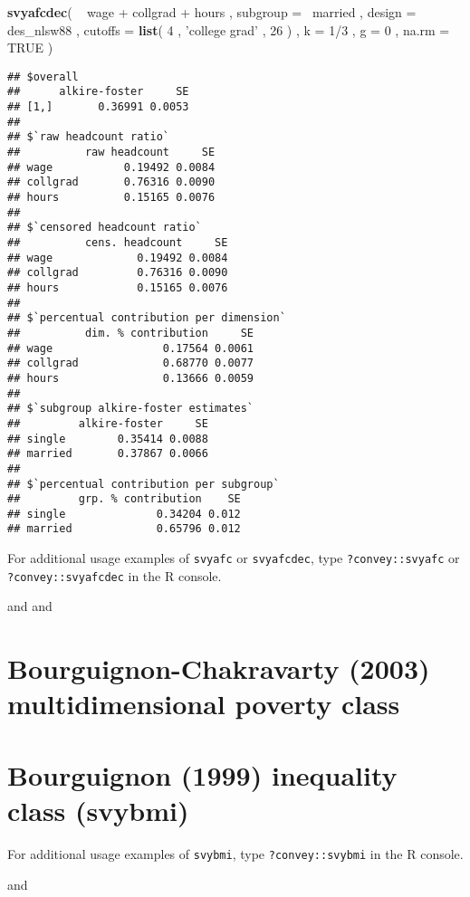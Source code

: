 \documentclass[]{book}
\newenvironment{Shaded}{\begin{snugshade}}{\end{snugshade}}
\newcommand{\KeywordTok}[1]{\textcolor[rgb]{0.13,0.29,0.53}{\textbf{{#1}}}}
\newcommand{\DataTypeTok}[1]{\textcolor[rgb]{0.13,0.29,0.53}{{#1}}}
\newcommand{\DecValTok}[1]{\textcolor[rgb]{0.00,0.00,0.81}{{#1}}}
\newcommand{\StringTok}[1]{\textcolor[rgb]{0.31,0.60,0.02}{{#1}}}
\newcommand{\OtherTok}[1]{\textcolor[rgb]{0.56,0.35,0.01}{{#1}}}
\newcommand{\NormalTok}[1]{{#1}}
\begin{document}
\begin{Shaded}
\begin{Highlighting}[]
\KeywordTok{svyafcdec}\NormalTok{(}
    \NormalTok{~}\StringTok{ }\NormalTok{wage +}\StringTok{ }\NormalTok{collgrad +}\StringTok{ }\NormalTok{hours , }
    \DataTypeTok{subgroup =} \NormalTok{~married , }
    \DataTypeTok{design =} \NormalTok{des_nlsw88 , }
    \DataTypeTok{cutoffs =} \KeywordTok{list}\NormalTok{( }\DecValTok{4} \NormalTok{, }\StringTok{'college grad'} \NormalTok{, }\DecValTok{26} \NormalTok{) , }
    \DataTypeTok{k =} \DecValTok{1}\NormalTok{/}\DecValTok{3} \NormalTok{, }
    \DataTypeTok{g =} \DecValTok{0} \NormalTok{,}
    \DataTypeTok{na.rm =} \OtherTok{TRUE}
\NormalTok{)}
\end{Highlighting}
\end{Shaded}

\begin{verbatim}
## $overall
##      alkire-foster     SE
## [1,]       0.36991 0.0053
## 
## $`raw headcount ratio`
##          raw headcount     SE
## wage           0.19492 0.0084
## collgrad       0.76316 0.0090
## hours          0.15165 0.0076
## 
## $`censored headcount ratio`
##          cens. headcount     SE
## wage             0.19492 0.0084
## collgrad         0.76316 0.0090
## hours            0.15165 0.0076
## 
## $`percentual contribution per dimension`
##          dim. % contribution     SE
## wage                 0.17564 0.0061
## collgrad             0.68770 0.0077
## hours                0.13666 0.0059
## 
## $`subgroup alkire-foster estimates`
##         alkire-foster     SE
## single        0.35414 0.0088
## married       0.37867 0.0066
## 
## $`percentual contribution per subgroup`
##         grp. % contribution    SE
## single              0.34204 0.012
## married             0.65796 0.012
\end{verbatim}

For additional usage examples of \texttt{svyafc} or \texttt{svyafcdec},
type \texttt{?convey::svyafc} or \texttt{?convey::svyafcdec} in the R
console.

\citep{alkire2011} and \citep{alkire2015} and \citep{pacifico2016}

\section{Bourguignon-Chakravarty (2003) multidimensional poverty
class}\label{bourguignon-chakravarty-2003-multidimensional-poverty-class}

\section{Bourguignon (1999) inequality class
(svybmi)}\label{bourguignon-1999-inequality-class-svybmi}

For additional usage examples of \texttt{svybmi}, type
\texttt{?convey::svybmi} in the R console.

\citep{bourguignon1999} and \citep{lugo2007}


\end{document}
